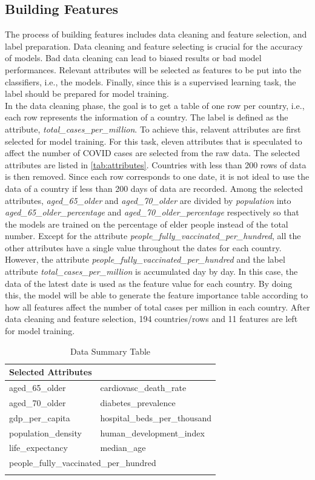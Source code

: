 \documentclass[10pt, a4paper, twocolumn]{article} %
\begin{document}
\subsection{Building Features}
The process of building features includes data cleaning and feature selection, and label preparation. Data cleaning 
and feature selecting is crucial for the accuracy of models. Bad data cleaning can lead to biased results or 
bad model performances. Relevant attributes will be selected as features to be put into the classifiers, i.e., 
the models. Finally, since this is a supervised learning task, the label should be prepared for model training.\\[10pt]
In the data cleaning phase, the goal is to get a table of one row per country, i.e., each row represents the 
information of a country. The label is defined as the attribute, \emph{total\_cases\_per\_million}. To achieve this, 
relavent attributes are first selected for model training. For this task, eleven attributes that is speculated to 
affect the number of COVID cases are selected from the raw data. The selected attributes are listed in 
\autoref{tab:attributes}. Countries with less than 200 rows of data is then removed. Since each row corresponds 
to one date, it is not ideal to use the data of a country if less than 200 days of data are recorded. Among the 
selected attributes, \emph{aged\_65\_older} and \emph{aged\_70\_older} are divided by \emph{population} into 
\emph{aged\_65\_older\_percentage} and \emph{aged\_70\_older\_percentage} respectively so that the models are 
trained on the percentage of elder people instead of the total number. Except for the attribute 
\emph{people\_fully\_vaccinated\_per\_hundred}, all the other attributes have a single value throughout the dates 
for each country. However, the attribute \emph{people\_fully\_vaccinated\_per\_hundred} and the label attribute 
\emph{total\_cases\_per\_million} is accumulated day by day. In this case, the data of the latest date is used as 
the feature value for each country. By doing this, the model will be able to generate the feature importance 
table according to how all features affect the number of total cases per million in each country. After data 
cleaning and feature selection, 194 countries/rows and 11 features are left for model training.\\[10pt]
\begin{table}
	\caption{Data Summary Table}
	\centering
	\begin{tabular}{ll}
		\toprule
		\textbf{Selected Attributes} &  \\
		\midrule
		aged\_65\_older & cardiovasc\_death\_rate \\
		aged\_70\_older & diabetes\_prevalence \\
		gdp\_per\_capita & hospital\_beds\_per\_thousand \\
		population\_density & human\_development\_index \\
		life\_expectancy & median\_age \\
		\multicolumn{2}{l}{people\_fully\_vaccinated\_per\_hundred} \\
		\bottomrule
	\label{tab:attributes}
	\end{tabular}
\end{table}
\end{document}
